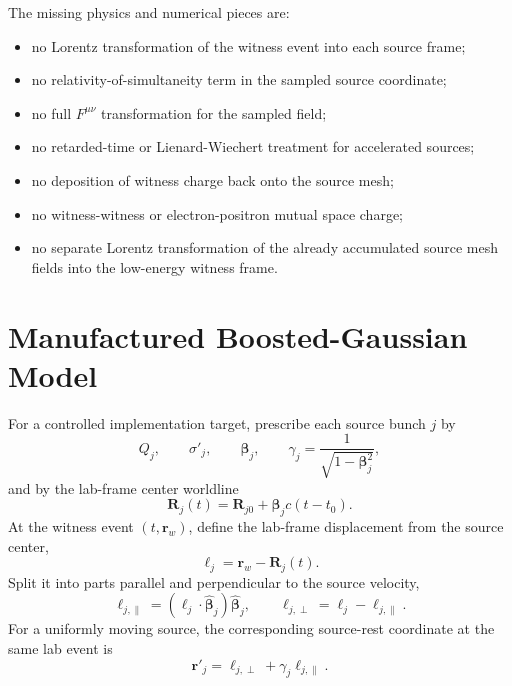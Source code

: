 \documentclass[11pt]{article}
\newcommand{\vect}[1]{\boldsymbol{#1}}
\newcommand{\betav}{\boldsymbol{\beta}}
\numberwithin{equation}{section}
\begin{document}
The missing physics and numerical pieces are:
\begin{itemize}
  \item no Lorentz transformation of the witness event into each source frame;
  \item no relativity-of-simultaneity term in the sampled source coordinate;
  \item no full \(F^{\mu\nu}\) transformation for the sampled field;
  \item no retarded-time or Lienard-Wiechert treatment for accelerated sources;
  \item no deposition of witness charge back onto the source mesh;
  \item no witness-witness or electron-positron mutual space charge;
  \item no separate Lorentz transformation of the already accumulated source
        mesh fields into the low-energy witness frame.
\end{itemize}

\section{Manufactured Boosted-Gaussian Model}

For a controlled implementation target, prescribe each source bunch \(j\) by
\begin{equation}
  Q_j,\qquad \sigma'_j,\qquad \betav_j,\qquad
  \gamma_j = \frac{1}{\sqrt{1-\betav_j^2}},
\end{equation}
and by the lab-frame center worldline
\begin{equation}
  \vect R_j(t) = \vect R_{j0} + \betav_j c(t-t_0).
\end{equation}
At the witness event \((t,\vect r_w)\), define the lab-frame displacement from
the source center,
\begin{equation}
  \boldsymbol{\ell}_j = \vect r_w - \vect R_j(t).
\end{equation}
Split it into parts parallel and perpendicular to the source velocity,
\begin{equation}
  \boldsymbol{\ell}_{j,\parallel}
  =
  (\boldsymbol{\ell}_j\cdot\hat{\betav}_j)\hat{\betav}_j,
  \qquad
  \boldsymbol{\ell}_{j,\perp}
  =
  \boldsymbol{\ell}_j-\boldsymbol{\ell}_{j,\parallel}.
\end{equation}
For a uniformly moving source, the corresponding source-rest coordinate at the
same lab event is
\begin{equation}
  \vect r'_j
  =
  \boldsymbol{\ell}_{j,\perp}
  +
  \gamma_j \boldsymbol{\ell}_{j,\parallel}.
\end{equation}
\end{document}
